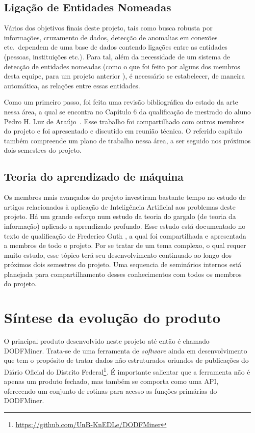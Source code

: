 \documentclass[12pt]{article}
\begin{document}
\subsection{Ligação de Entidades Nomeadas}
Vários dos objetivos finais deste projeto, tais como
busca robusta por informações, cruzamento de dados, detecção 
de anomalias em conexões etc.\ dependem de uma base de dados 
contendo ligações entre as entidades (pessoas, instituições
etc.). Para tal, além da necessidade de um sistema de 
detecção de entidades nomeadas (como o que foi feito por alguns dos membros desta
equipe, para um projeto anterior \cite{luz_etal_propor2018}),
é necessário se estabelecer, de maneira automática, as relações
entre essas entidades. 

Como um primeiro passo, foi feita uma revisão bibliográfica
do estado da arte nessa área, a qual se encontra no Capítulo 6
da qualificação de mestrado do aluno Pedro H. Luz de Araújo~\cite{luz_msc_qualify_unb2020}. Esse trabalho foi compartilhado com outros membros do projeto e foi apresentado e discutido em reunião técnica. O referido capítulo também compreende um plano de trabalho nessa área, a ser seguido nos próximos dois semestres do projeto.

\subsection{Teoria do aprendizado de máquina}
Os membros mais avançados do projeto investiram bastante tempo 
no estudo de artigos relacionados à aplicação de Inteligência Artificial
aos problemas deste projeto. 
Há um grande esforço num estudo da teoria do gargalo
(de teoria da informação) aplicado a aprendizado profundo.
Esse estudo está documentado no texto de qualificação 
de Frederico Guth \cite{guth_msc_qualify_unb2020}, a qual
foi compartilhada e apresentada a membros de todo o projeto.
Por se tratar de um tema complexo, o qual requer muito estudo,
esse tópico terá seu desenvolvimento continuado ao longo dos próximos dois semestres do projeto. 
Uma sequencia de seminários internos está planejada para compartilhamento desses conhecimentos com todos os membros do projeto.

\section{Síntese da evolução do produto}
\label{sec:sintese}

O principal produto desenvolvido neste projeto até então é chamado DODFMiner. Trata-se de uma ferramenta de \emph{software} ainda em desenvolvimento que tem o propósito de tratar dados não estruturados oriundos de publicações  do Diário Oficial do Distrito Federal\footnote{\url{https://github.com/UnB-KnEDLe/DODFMiner}}. É importante salientar que a ferramenta não é apenas um produto fechado, mas também se comporta como uma API, oferecendo um conjunto de rotinas para acesso as funções primárias do DODFMiner. 
\end{document}
